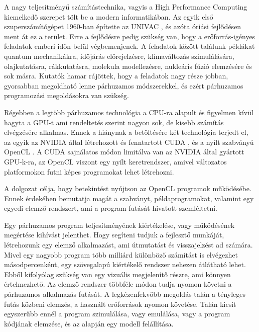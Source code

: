 
A nagy teljesítményű számítástechnika, vagyis a High Performance Computing kiemelkedő szerepet tölt be a modern informatikában. Az egyik első szuperszámítógépet 1960-ban építette az UNIVAC \cite{larc}, és azóta óriási fejlődésen ment át ez a terület. Erre a fejlődésre pedig szükség van, hogy a erőforrás-igényes feladatok emberi időn belül végbemenjenek. A feladatok között találunk példákat quantum mechanikákra, időjárás előrejelzésre, klímaváltozás szimulálására, olajkutatásra, rákkutatásra, molekula modellezésre, nukleáris fúzió elemzésére és sok másra. Kutatók hamar rájöttek, hogy a feladatok nagy része jobban, gyorsabban megoldható lenne párhuzamos módszerekkel, és ezért párhuzamos programozási megoldásokra van szükség.

Régebben a legtöbb párhuzamos technológia a CPU-ra alapult és figyelmen kívül hagyta a GPU-t ami rendeltetés szerint nagyon sok, de kisebb számítás elvégzésére alkalmas. Ennek a hiánynak a betöltésére két technológia terjedt el, az egyik az NVIDIA által létrehozott és fenntartott CUDA \cite{cuda}, és a nyílt szabványú OpenCL \cite{opencl}. A CUDA sajnálatos módon limitálva van az NVIDIA által gyártott GPU-k-ra, az OpenCL viszont egy nyílt keretrendszer, amivel változatos platformokon futni képes programokat lehet létrehozni.

 A dolgozat célja, hogy betekintést nyújtson az OpenCL programok működésébe. Ennek érdekében bemutatja magát a szabványt, példaprogramokat, valamint egy egyedi elemző rendszert, ami a program futását hivatott szemléltetni.

Egy párhuzamos program teljesítményének kiértékelése, vagy működésének megértése kihívást jelenthet. Hogy segíteni tudjuk a fejlesztő munkáját, létrehozunk egy elemző alkalmazást, ami útmutatást és visszajelzést ad számára. Mivel egy nagyobb program több milliárd különböző számítást is elvégezhet másodpercenként, egy szövegalapú kiértékelő rendszer nehezen átlátható lehet. Ebből kifolyólag szükség van egy vizuális megjelenítő részre, ami könnyen értelmezhető. Az elemző rendszer többféle módon tudja nyomon követni a párhuzamos alkalmazás futását. A legkézenfekvőbb megoldás talán a tényleges futás közbeni elemzés, a használt erőforrások nyomon követése. Talán kicsit egyszerűbb ennél a program szimulálása, vagy emulálása, vagy a program kódjának elemzése, és az alapján egy modell felállítása.
